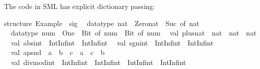 \begin{isabellebody}
\begin{isamarkuptext}
\isanewline
{}\isanewline%
\end{isamarkuptext}%
\isamarkuptrue%
%
\endisatagquotetypewriter
{\isafoldquotetypewriter}%
%
\isadelimquotetypewriter
%
\endisadelimquotetypewriter
%
\begin{isamarkuptext}%
\noindent The code in SML has explicit dictionary passing:%
\end{isamarkuptext}%
\isamarkuptrue%
%
\isadelimquotetypewriter
%
\endisadelimquotetypewriter
%
\isatagquotetypewriter
%
\begin{isamarkuptext}%
structure\ Example\ {}\ sig\isanewline
\ \ datatype\ nat\ {}\ Zero{}nat\ {}\ Suc\ of\ nat\isanewline
\ \ datatype\ num\ {}\ One\ {}\ Bit{}\ of\ num\ {}\ Bit{}\ of\ num\isanewline
\ \ val\ plus{}nat\ {}\ nat\ {}{}\ nat\ {}{}\ nat\isanewline
\ \ val\ abs{}int\ {}\ IntInf{}int\ {}{}\ IntInf{}int\isanewline
\ \ val\ sgn{}int\ {}\ IntInf{}int\ {}{}\ IntInf{}int\isanewline
\ \ val\ apsnd\ {}\ {}{}a\ {}{}\ {}b{}\ {}{}\ {}c\ {}\ {}a\ {}{}\ {}c\ {}\ {}b\isanewline
\ \ val\ divmod{}int\ {}\ IntInf{}int\ {}{}\ IntInf{}int\ {}{}\ IntInf{}int\ {}\ IntInf{}int\isanewline

\end{isamarkuptext}
\end{isabellebody}
